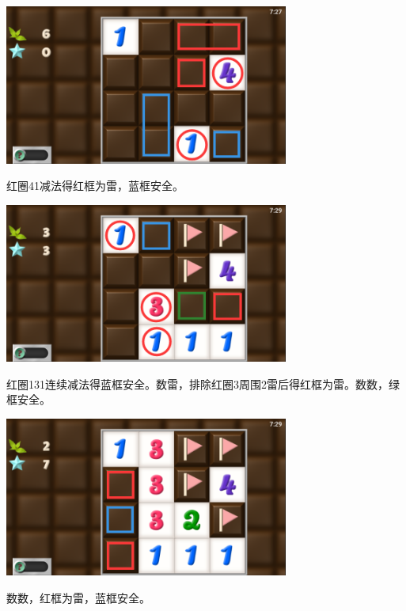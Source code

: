 \subsection{} %
\begin{center}
    \includegraphics[width=0.7\textwidth]{puzzle/42-1.png}
\end{center}
红圈41减法得红框为雷，蓝框安全。
\begin{center}
    \includegraphics[width=0.7\textwidth]{puzzle/42-2.png}
\end{center}
红圈131连续减法得蓝框安全。数雷，排除红圈3周围2雷后得红框为雷。数数，绿框安全。
\begin{center}
    \includegraphics[width=0.7\textwidth]{puzzle/42-3.png}
\end{center}
数数，红框为雷，蓝框安全。

